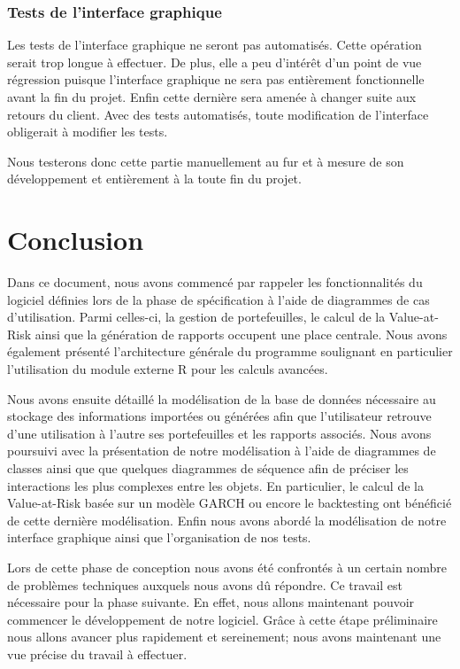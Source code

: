 \documentclass[a4paper,titlepage,french]{report}
\begin{document}
\subsection{Tests de l'interface graphique}

Les tests de l'interface graphique ne seront pas automatisés.
Cette opération serait trop longue à effectuer.
De plus, elle a peu d'intérêt d'un point de vue régression puisque l'interface graphique ne sera pas entièrement fonctionnelle avant la fin du projet.
Enfin cette dernière sera amenée à changer suite aux retours du client.
Avec des tests automatisés, toute modification de l'interface obligerait à modifier les tests.

Nous testerons donc cette partie manuellement au fur et à mesure de son développement et entièrement à la toute fin du projet.


\chapter*{Conclusion}

Dans ce document, nous avons commencé par rappeler les fonctionnalités du logiciel définies lors de la phase de spécification à l'aide de  diagrammes de cas d'utilisation.
Parmi celles-ci, la gestion de portefeuilles, le calcul de la Value-at-Risk ainsi que la génération de rapports occupent une place centrale.
Nous avons également présenté l'architecture générale du programme soulignant en particulier l'utilisation du module externe R pour les calculs avancées.

Nous avons ensuite détaillé la modélisation de la base de données nécessaire au stockage des informations importées ou générées afin que l'utilisateur retrouve d'une utilisation à l'autre ses portefeuilles et les rapports associés.
Nous avons poursuivi avec la présentation de notre modélisation à l'aide de diagrammes de classes ainsi que que quelques diagrammes de séquence afin de préciser les interactions les plus complexes entre les objets.
En particulier, le calcul de la Value-at-Risk basée sur un modèle GARCH ou encore le backtesting ont bénéficié de cette dernière modélisation.
Enfin nous avons abordé la modélisation de notre interface graphique ainsi que l'organisation de nos tests.

Lors de cette phase de conception nous avons été confrontés à un certain nombre de problèmes techniques auxquels nous avons dû répondre.
Ce travail est nécessaire pour la phase suivante.
En effet, nous allons maintenant pouvoir commencer le développement de notre logiciel.
Grâce à cette étape préliminaire nous allons avancer plus rapidement et sereinement; nous avons maintenant une vue précise du travail à effectuer.




\end{document}
